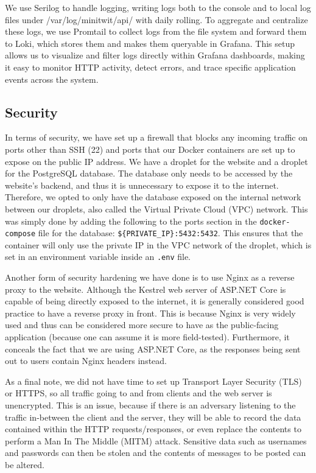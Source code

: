 \documentclass[12pt,a4paper,reqno]{report}
\begin{document}
We use Serilog to handle logging, writing logs both to the console and to local log files under /var/log/minitwit/api/ with daily rolling. To aggregate and centralize these logs, we use Promtail to collect logs from the file system and forward them to Loki, which stores them and makes them queryable in Grafana. This setup allows us to visualize and filter logs directly within Grafana dashboards, making it easy to monitor HTTP activity, detect errors, and trace specific application events across the system.

\subsection{Security}

In terms of security, we have set up a firewall that blocks any incoming traffic on ports other than SSH (22) and ports that our Docker containers are set up to expose on the public IP address. We have a droplet for the website and a droplet for the PostgreSQL database. The database only needs to be accessed by the website’s backend, and thus it is unnecessary to expose it to the internet. Therefore, we opted to only have the database exposed on the internal network between our droplets, also called the Virtual Private Cloud (VPC) network. This was simply done by adding the following to the ports section in the \texttt{docker-compose} file for the database: \texttt{\$\{PRIVATE\_IP\}:5432:5432}. This ensures that the container will only use the private IP in the VPC network of the droplet, which is set in an environment variable inside an \texttt{.env} file.

Another form of security hardening we have done is to use Nginx as a reverse proxy to the website. Although the Kestrel web server of ASP.NET Core is capable of being directly exposed to the internet, it is generally considered good practice to have a reverse proxy in front. This is because Nginx is very widely used and thus can be considered more secure to have as the public-facing application (because one can assume it is more field-tested). Furthermore, it conceals the fact that we are using ASP.NET Core, as the responses being sent out to users contain Nginx headers instead.

As a final note, we did not have time to set up Transport Layer Security (TLS) or HTTPS, so all traffic going to and from clients and the web server is unencrypted. This is an issue, because if there is an adversary listening to the traffic in-between the client and the server, they will be able to record the data contained within the HTTP requests/responses, or even replace the contents to perform a Man In The Middle (MITM) attack. Sensitive data such as usernames and passwords can then be stolen and the contents of messages to be posted can be altered.
\end{document}
